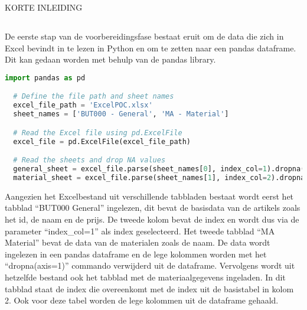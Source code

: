 
\chapter{}%
\label{ch:ProofOfConcept}
KORTE INLEIDING

\section{}%
\label{sec:voorbereiding}

De eerste stap van de voorbereidingsfase bestaat eruit om de data die zich in Excel bevindt in te lezen in Python en om te zetten naar een pandas dataframe. Dit kan gedaan worden met behulp van de pandas library.

\begin{lstlisting}[language=Python, caption={Het inlezen van Excel-gegevens in een pandas dataframe.}]
  import pandas as pd

  # Define the file path and sheet names
  excel_file_path = 'ExcelPOC.xlsx'
  sheet_names = ['BUT000 - General', 'MA - Material']

  # Read the Excel file using pd.ExcelFile
  excel_file = pd.ExcelFile(excel_file_path)

  # Read the sheets and drop NA values
  general_sheet = excel_file.parse(sheet_names[0], index_col=1).dropna(axis=1)
  material_sheet = excel_file.parse(sheet_names[1], index_col=2).dropna(axis=1)
\end{lstlisting}

Aangezien het Excelbestand uit verschillende tabbladen bestaat wordt eerst het tabblad ``BUT000 \textendash General'' ingelezen, dit bevat de basisdata van de artikels zoals het id, de naam en de prijs. De tweede kolom bevat de index en wordt dus via de parameter ``index\_col=1'' als index geselecteerd. Het tweede tabblad ``MA \textendash Material'' bevat de data van de materialen zoals de naam. De data wordt ingelezen in een pandas dataframe en de lege kolommen worden met het ``dropna(axis=1)'' commando verwijderd uit de dataframe.
Vervolgens wordt uit hetzelfde bestand ook het tabblad met de materiaalgegevens ingeladen. In dit tabblad staat de index die overeenkomt met de index uit de basistabel in kolom 2. Ook voor deze tabel worden de lege kolommen uit de dataframe gehaald.

